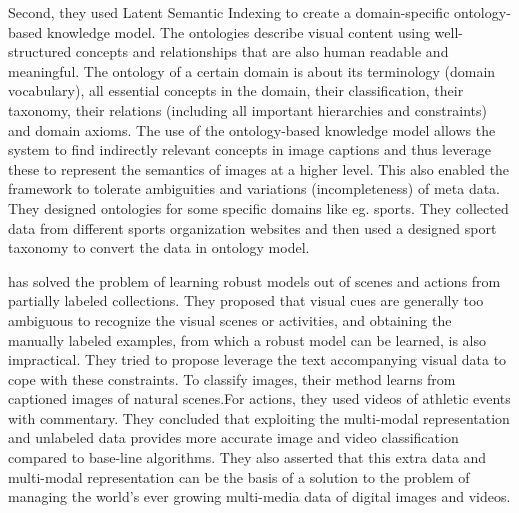 Second, they used Latent Semantic Indexing to create a domain-specific ontology-based knowledge model. The ontologies describe visual content using well-structured concepts and relationships that are also human readable and meaningful. The ontology of a certain domain is about its terminology (domain vocabulary), all essential concepts in the domain, their classification, their taxonomy, their relations (including all important hierarchies and constraints) and domain axioms. The use of the ontology-based knowledge model allows the system to find indirectly relevant concepts in image captions and thus leverage these to represent the semantics of images at a higher level. This also enabled the framework to tolerate ambiguities and variations (incompleteness) of meta data. They designed ontologies for some specific domains like eg. sports. They collected data from different sports organization websites and then used a designed sport taxonomy to convert the data in ontology model.

 \citet*{gupta} has solved the 
problem of learning robust models out of scenes and actions from 
partially labeled collections. They proposed that visual cues are generally too ambiguous to recognize the visual scenes or activities, and obtaining the manually labeled examples, from which a robust model can be learned, is also impractical.  They tried to propose leverage the text accompanying visual data to cope with these constraints. To classify images, their method learns from captioned images of natural scenes.For actions, they used videos of athletic events with commentary. They concluded that exploiting the multi-modal representation and unlabeled data provides more accurate image and video classification compared to base-line algorithms. They also asserted that this extra data and multi-modal representation can be the basis of a solution to the problem of managing the world's ever 
growing multi-media data of digital images and videos.


